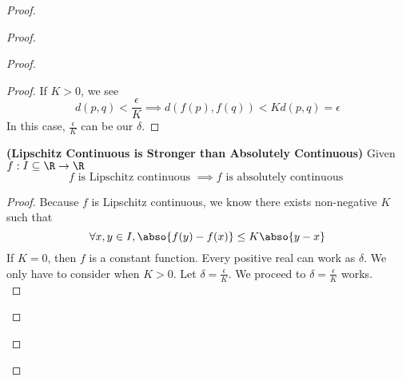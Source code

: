 \documentclass{report}
\begin{document}
\begin{proof}
\begin{proof}
\begin{proof}
\begin{proof}
If $K>0$, we see 
\begin{equation*}
d(p,q)<\frac{\epsilon}{K}\implies d(f(p),f(q))<Kd(p,q)=\epsilon 
\end{equation*}
In this case, $\frac{\epsilon}{K}$ can be our $\delta$. 
\end{proof}
\begin{theorem}
\label{5.5.6}
\textbf{(Lipschitz Continuous is Stronger than Absolutely Continuous)} Given $f:I\subseteq \R\rightarrow \R$
\begin{equation*}
f\text{ is Lipschitz continuous }\implies f\text{ is absolutely continuous }
\end{equation*}
\end{theorem}
\begin{proof}
Because $f$ is Lipschitz continuous, we know there exists non-negative $K$ such that 
\begin{equation*}
\forall x,y \in I, \abso{f(y)-f(x)}\leq K\abso{y-x}
\end{equation*}
If $K=0$, then $f$ is a constant function. Every positive real can work as $\delta$. We only have to consider when $K>0$. Let $\delta=\frac{\epsilon}{K}$. We proceed to $\delta=\frac{\epsilon}{K}$ works.\\


\end{proof}
\end{proof}
\end{proof}
\end{proof}
\end{document}
